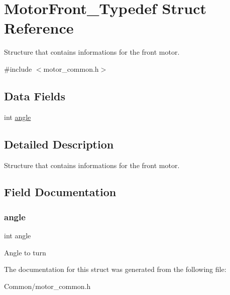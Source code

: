 \hypertarget{struct_motor_front___typedef}{}\section{Motor\+Front\+\_\+\+Typedef Struct Reference}
\label{struct_motor_front___typedef}


Structure that contains informations for the front motor.  




{\ttfamily \#include $<$motor\+\_\+common.\+h$>$}

\subsection*{Data Fields}
\begin{DoxyCompactItemize}
\item 
int \hyperlink{struct_motor_front___typedef_a63177970cacb40efba67ce501ea89210}{angle}
\end{DoxyCompactItemize}


\subsection{Detailed Description}
Structure that contains informations for the front motor. 

\subsection{Field Documentation}
\mbox{\label{struct_motor_front___typedef_a63177970cacb40efba67ce501ea89210}} 
\subsubsection{\texorpdfstring{angle}{angle}}
{\footnotesize\ttfamily int angle}

Angle to turn 

The documentation for this struct was generated from the following file\+:\begin{DoxyCompactItemize}
\item 
Common/motor\+\_\+common.\+h\end{DoxyCompactItemize}
